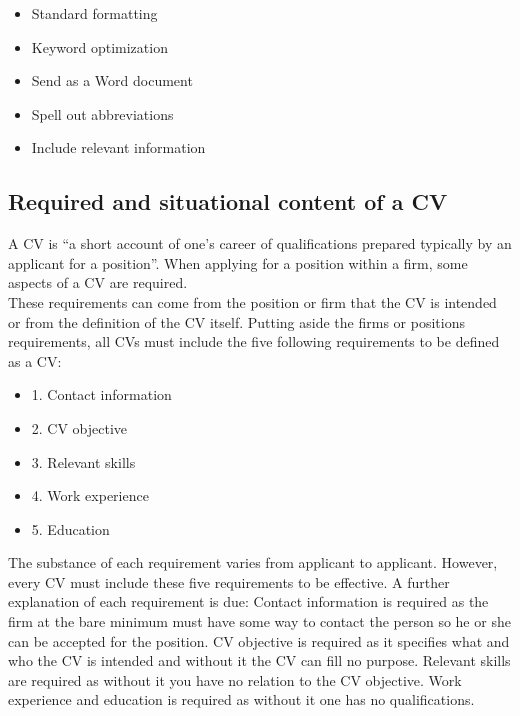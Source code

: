 \begin{itemize}
\item Standard formatting
\item Keyword optimization
\item Send as a Word document
\item Spell out abbreviations
\item Include relevant information\cite{ATS}
\end{itemize}
 

\subsection{Required and situational content of a CV}
A CV is “a short account of one’s career of qualifications prepared typically by an applicant for a position”.\cite{Difference_between_resume_and_curriculum_Vitae}
When applying for a position within a firm, some aspects of a CV are required. \\
These requirements can come from the position or firm that the CV is intended or from the definition of the CV itself.
Putting aside the firms or positions requirements, all CVs must include the five following requirements to be defined as a CV:

\begin{itemize}
   \item 1. Contact information
   \item 2. CV objective
   \item 3. Relevant skills
   \item 4. Work experience
   \item 5. Education\cite{Write_a_curriculum_Vitae} \\
\end{itemize}

The substance of each requirement varies from applicant to applicant. However, every CV must include these five requirements to be effective.
A further explanation of each requirement is due:
Contact information is required as the firm at the bare minimum must have some way to contact the person so he or she can be accepted for the position.
CV objective is required as it specifies what and who the CV is intended and without it the CV can fill no purpose.
Relevant skills are required as without it you have no relation to the CV objective.
Work experience and education is required as without it one has no qualifications. \\

